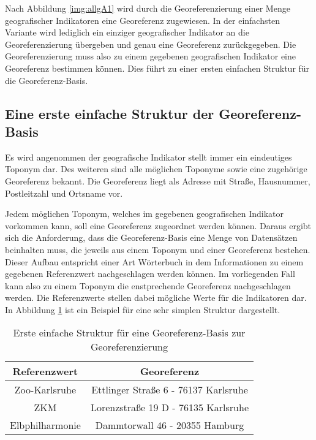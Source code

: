 		Nach Abbildung \ref{img:allgA1} wird durch die Georeferenzierung einer Menge geografischer Indikatoren eine Georeferenz zugewiesen.
		In der einfachsten Variante wird lediglich ein einziger geografischer Indikator an die Georeferenzierung übergeben und genau eine Georeferenz zurückgegeben.
		Die Georeferenzierung muss also zu einem gegebenen geografischen Indikator eine Georeferenz bestimmen können.
		Dies führt zu einer ersten einfachen Struktur für die Georeferenz-Basis.	

		\subsection*{Eine erste einfache Struktur der Georeferenz-Basis} 

			Es wird angenommen der geografische Indikator stellt immer ein eindeutiges Toponym dar.
			Des weiteren sind alle möglichen Toponyme sowie eine zugehörige Georeferenz bekannt. 
			Die Georeferenz liegt als Adresse mit Straße, Hausnummer, Postleitzahl und Ortsname vor.

			Jedem möglichen Toponym, welches im gegebenen geografischen Indikator vorkommen kann, soll eine Georeferenz zugeordnet werden können. 
			Daraus ergibt sich die Anforderung, dass die Georeferenz-Basis eine Menge von Datensätzen beinhalten muss, die jeweils aus einem Toponym und einer Georeferenz bestehen.
			Dieser Aufbau entspricht einer Art Wörterbuch in dem Informationen zu einem gegebenen Referenzwert nachgeschlagen werden können.
			Im vorliegenden Fall kann also zu einem Toponym die enstprechende Georeferenz nachgeschlagen werden.
			Die Referenzwerte stellen dabei mögliche Werte für die Indikatoren dar. 
			In Abbildung \ref{tab:simpleStruktur} ist ein Beispiel für eine sehr simplen Struktur dargestellt.

			\begin{table}[htpb]
					\caption{Erste einfache Struktur für eine Georeferenz-Basis zur Georeferenzierung} 
					\centering
					\begin{tabular}{|c|c|}
						\hline
						Referenzwert & Georeferenz \\
						\hline\hline
						Zoo-Karlsruhe & Ettlinger Straße 6 - 76137 Karlsruhe \\
						\hline
						ZKM & Lorenzstraße 19 D - 76135 Karlsruhe \\
						\hline
						Elbphilharmonie & Dammtorwall 46 - 20355 Hamburg \\
						\hline
					\end{tabular}
					\label{tab:simpleStruktur} 
			\end{table} 

